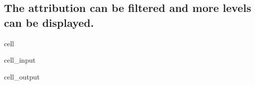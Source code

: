 \documentclass[letterpaper,10pt,english]{jupyterBook}
\begin{document}
\subsection{The attribution can be filtered and more levels can be displayed.}
\label{\detokenize{content/06_ModelAnalytics/AttributionSomeFeatures:the-attribution-can-be-filtered-and-more-levels-can-be-displayed}}
\begin{sphinxuseclass}{cell}\begin{sphinxVerbatimInput}

\begin{sphinxuseclass}{cell_input}
\begin{sphinxVerbatim}[commandchars=\\\{\}]
\PYG{p}{[}\PYG{p}{]} 
\end{sphinxVerbatim}

\end{sphinxuseclass}\end{sphinxVerbatimInput}
\begin{sphinxVerbatimOutput}

\begin{sphinxuseclass}{cell_output}
\noindent{}

\end{sphinxuseclass}\end{sphinxVerbatimOutput}

\end{sphinxuseclass}
\end{document}
